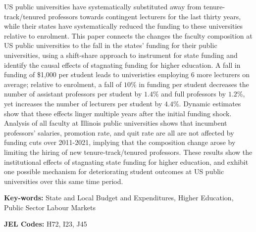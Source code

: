 US public universities have systematically substituted away from tenure-track/tenured professors towards contingent lecturers for the last thirty years, while their states have systematically reduced the funding to these universities relative to enrolment.
This paper connects the changes the faculty composition at US public universities to the fall in the states' funding for their public universities, using a shift-share approach to instrument for state funding and identify the causal effects of stagnating funding for higher education.
A fall in funding of \$1,000 per student leads to univeristies employing 6 more lecturers on average; relative to enrolment, a fall of $10$\% in funding per student decreases the number of assistant professors per student by $1.4$\% and full professors by $1.2$\%, yet increases the number of lecturers per student by $4.4$\%.
Dynamic estimates show that these effects linger multiple years after the initial funding shock.
Analysis of all faculty at Illinois public universities shows that incumbent professors' salaries, promotion rate, and quit rate are all are not affected by funding cuts over 2011-2021, implying that the composition change arose by limiting the hiring of new tenure-track/tenured professors.
These results show the institutional effects of stagnating state funding for higher education, and exhibit one possible mechanism for deteriorating student outcomes at US public universities over this same time period.

\vfill
\noindent
\textbf{Key-words:}
State and Local Budget and Expenditures,
Higher Education,
Public Sector Labour Markets

\vspace{0.05cm}
\noindent
\textbf{JEL Codes:} H72, I23, J45

